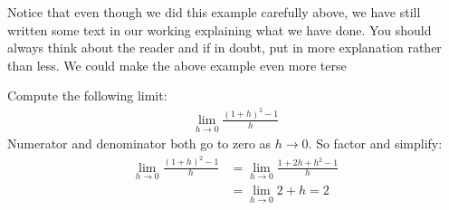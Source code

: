 Notice that even though we did this example carefully above, we have still
written some text in our working explaining what we have done. You should
always think about the reader and if in doubt, put in more explanation rather
than less. We could make the above example even more terse
\begin{eg}\label{eg_1_4_7}
 Compute the following limit:
 \begin{align*}
  \lim_{h \to 0} \frac{(1+h)^2-1}{h}
 \end{align*}
 Numerator and denominator both go to zero as $h\to 0$. So factor and simplify:
 \begin{align*}
  \lim_{h \to 0} \frac{(1+h)^2-1}{h}
  &= \lim_{h \to 0} \frac{1+2h+h^2-1}{h} \\
  &= \lim_{h \to 0} 2+h = 2
 \end{align*}
\end{eg}


